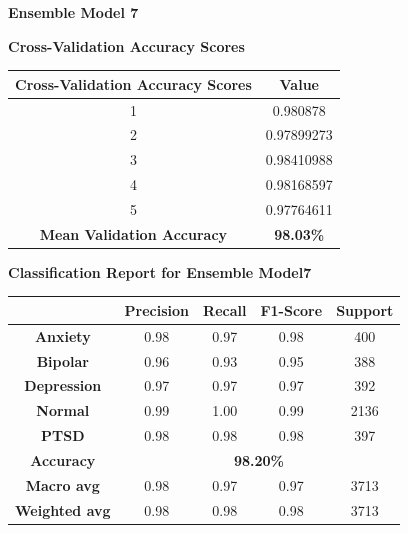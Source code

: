 \pagebreak

\vspace{1em}
\noindent
\textbf{Ensemble Model 7}

\begin{center}
    \textbf{Cross-Validation Accuracy Scores} \\[0.5em]
    \begin{tabular}{|c|c|}
        \hline
        \textbf{Cross-Validation Accuracy Scores} & \textbf{Value} \\ \hline
        1 & 0.980878 \\ \hline
        2 & 0.97899273 \\ \hline
        3 & 0.98410988 \\ \hline
        4 & 0.98168597 \\ \hline
        5 & 0.97764611 \\ \hline
        \textbf{Mean Validation Accuracy} & \textbf{98.03\%} \\ \hline
    \end{tabular}
\end{center}

\begin{center}
    \textbf{Classification Report for Ensemble Model7} \\[0.5em]
    \begin{tabular}{|c|c|c|c|c|}
        \hline
        & \textbf{Precision} & \textbf{Recall} & \textbf{F1-Score} & \textbf{Support} \\ \hline
        \textbf{Anxiety}    & 0.98 & 0.97 & 0.98 & 400 \\ \hline
        \textbf{Bipolar}    & 0.96 & 0.93 & 0.95 & 388 \\ \hline
        \textbf{Depression} & 0.97 & 0.97 & 0.97 & 392 \\ \hline
        \textbf{Normal}     & 0.99 & 1.00 & 0.99 & 2136 \\ \hline
        \textbf{PTSD}       & 0.98 & 0.98 & 0.98 & 397 \\ \hline
        \textbf{Accuracy}   & \multicolumn{4}{c|}{\textbf{98.20\%}} \\ \hline
        \textbf{Macro avg}  & 0.98 & 0.97 & 0.97 & 3713 \\ \hline
        \textbf{Weighted avg} & 0.98 & 0.98 & 0.98 & 3713 \\ \hline
    \end{tabular}
\end{center}


